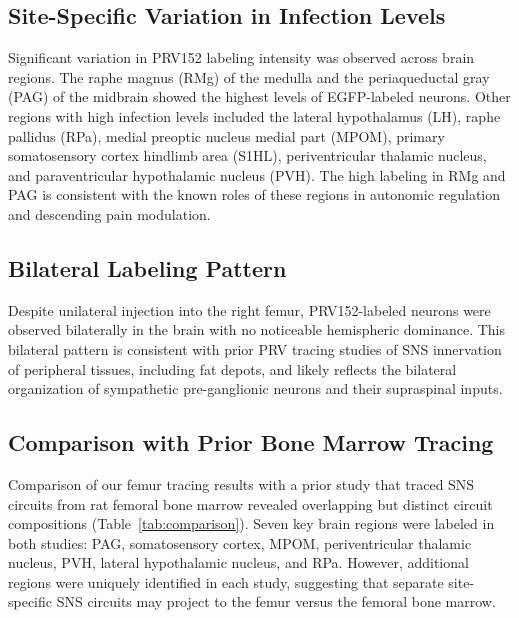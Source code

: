 \documentclass[12pt]{article}
\begin{document}
\subsection{Site-Specific Variation in Infection Levels}

Significant variation in PRV152 labeling intensity was observed across brain regions. The raphe magnus (RMg) of the medulla and the periaqueductal gray (PAG) of the midbrain showed the highest levels of EGFP-labeled neurons. Other regions with high infection levels included the lateral hypothalamus (LH), raphe pallidus (RPa), medial preoptic nucleus medial part (MPOM), primary somatosensory cortex hindlimb area (S1HL), periventricular thalamic nucleus, and paraventricular hypothalamic nucleus (PVH). The high labeling in RMg and PAG is consistent with the known roles of these regions in autonomic regulation and descending pain modulation.

\subsection{Bilateral Labeling Pattern}

Despite unilateral injection into the right femur, PRV152-labeled neurons were observed bilaterally in the brain with no noticeable hemispheric dominance. This bilateral pattern is consistent with prior PRV tracing studies of SNS innervation of peripheral tissues, including fat depots, and likely reflects the bilateral organization of sympathetic pre-ganglionic neurons and their supraspinal inputs.

\subsection{Comparison with Prior Bone Marrow Tracing}

Comparison of our femur tracing results with a prior study that traced SNS circuits from rat femoral bone marrow revealed overlapping but distinct circuit compositions (Table~\ref{tab:comparison}). Seven key brain regions were labeled in both studies: PAG, somatosensory cortex, MPOM, periventricular thalamic nucleus, PVH, lateral hypothalamic nucleus, and RPa. However, additional regions were uniquely identified in each study, suggesting that separate site-specific SNS circuits may project to the femur versus the femoral bone marrow.
\end{document}
